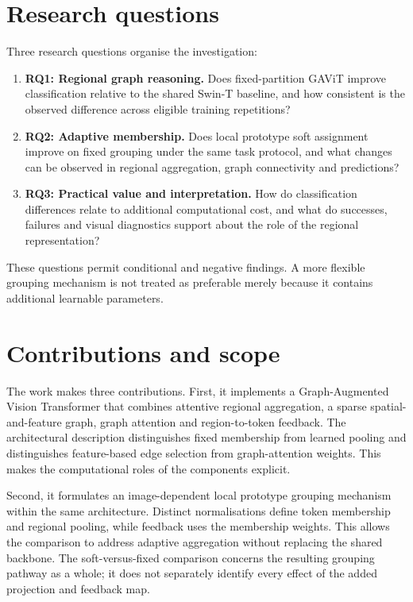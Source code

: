 \section{Research questions}

Three research questions organise the investigation:
\begin{enumerate}
 \item \textbf{RQ1: Regional graph reasoning.} Does fixed-partition GAViT
 improve classification relative to the shared Swin-T baseline, and how
 consistent is the observed difference across eligible training repetitions?
 \item \textbf{RQ2: Adaptive membership.} Does local prototype soft assignment
 improve on fixed grouping under the same task protocol, and what changes
 can be observed in regional aggregation, graph connectivity and predictions?
 \item \textbf{RQ3: Practical value and interpretation.} How do classification
 differences relate to additional computational cost, and what do successes,
 failures and visual diagnostics support about the role of the regional
 representation?
\end{enumerate}
These questions permit conditional and negative findings. A more flexible
grouping mechanism is not treated as preferable merely because it contains
additional learnable parameters.

\section{Contributions and scope}

The work makes three contributions. First, it implements a
Graph-Augmented Vision Transformer that combines attentive regional
aggregation, a sparse spatial-and-feature graph, graph attention and
region-to-token feedback. The architectural description distinguishes fixed
membership from learned pooling and distinguishes feature-based edge
selection from graph-attention weights. This makes the computational roles
of the components explicit.

Second, it formulates an image-dependent local prototype grouping mechanism
within the same architecture. Distinct normalisations define token membership
and regional pooling, while feedback uses the membership weights. This allows
the comparison to address adaptive aggregation without replacing the shared
backbone. The soft-versus-fixed
comparison concerns the resulting grouping pathway as a whole; it does not
separately identify every effect of the added projection and feedback map.

